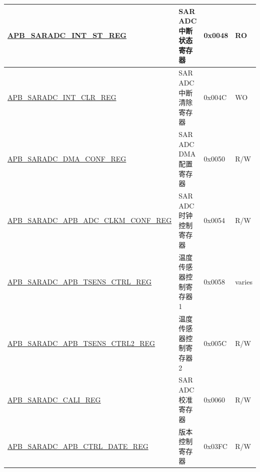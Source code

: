 \begin{longtable}{ | p{7cm} | p{5.2cm} | p{1.3cm} | p{1cm} | }
\hyperref[regdesc:APBSARADCINTSTREG]{APB\_SARADC\_INT\_ST\_REG} & SAR ADC 中断状态寄存器 & 0x0048 & RO \\ \hline
\hyperref[regdesc:APBSARADCINTCLRREG]{APB\_SARADC\_INT\_CLR\_REG} & SAR ADC 中断清除寄存器 & 0x004C & WO \\ \hline
\hyperref[regdesc:APBSARADCDMACONFREG]{APB\_SARADC\_DMA\_CONF\_REG} & SAR ADC DMA 配置寄存器 & 0x0050 & R/W \\ \hline
\hyperref[regdesc:APBSARADCCLKMCONFREG]{APB\_SARADC\_APB\_ADC\_CLKM\_CONF\_REG} & SAR ADC 时钟控制寄存器 & 0x0054 & R/W \\ \hline
\hyperref[regdesc:APBSARADCAPBTSENSCTRLREG]{APB\_SARADC\_APB\_TSENS\_CTRL\_REG} & 温度传感器控制寄存器 1 & 0x0058 & varies \\ \hline
\hyperref[regdesc:APBSARADCTSENSCTRL2REG]{APB\_SARADC\_APB\_TSENS\_CTRL2\_REG} & 温度传感器控制寄存器 2 & 0x005C & R/W \\ \hline
\hyperref[regdesc:APBSARADCCALIREG]{APB\_SARADC\_CALI\_REG} & SAR ADC 校准寄存器 & 0x0060 & R/W \\ \hline
\hyperref[regdesc:APBSARADCCTRLDATEREG]{APB\_SARADC\_APB\_CTRL\_DATE\_REG} & 版本控制寄存器 & 0x03FC & R/W \\ \hline
\end{longtable}
